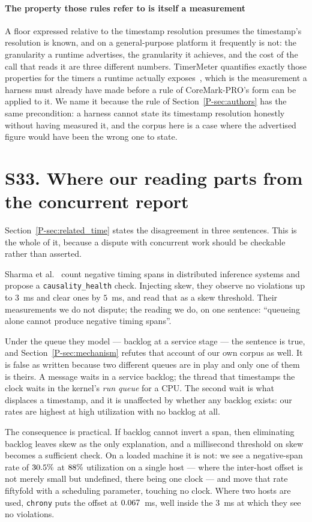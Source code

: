 \documentclass[10pt,journal,onecolumn]{IEEEtran}
\newcommand{\mainRelatedTime}{\ref{P-sec:related_time}}    %
\newcommand{\mainModeA}{\ref{P-sec:mechanism}}             %
\newcommand{\mainAuthors}{\ref{P-sec:authors}}        %
\begin{document}
\paragraph{The property those rules refer to is itself a measurement}
A floor expressed relative to the timestamp resolution presumes the timestamp's resolution is known,
and on a general-purpose platform it frequently is not: the granularity a runtime advertises,
the granularity it achieves, and the cost of the call that reads it are three different
numbers. TimerMeter quantifies exactly those properties for the timers a runtime actually
exposes~\cite{kuperberg2009timermeter}, which is the measurement a harness must already have
made before a rule of CoreMark-PRO's form can be applied to it. We name it because the rule of
Section~\mainAuthors{} has the same precondition: a harness cannot state its timestamp
resolution honestly without having measured it, and the corpus here is a case where the
advertised figure would have been the wrong one to state.

\section{S33. Where our reading parts from the concurrent report}
\label{sec:rival_reading}

Section~\mainRelatedTime{} states the disagreement in three sentences. This is the whole of
it, because a dispute with concurrent work should be checkable rather than asserted.

Sharma et al.~\cite{sharma2026causality} count negative timing spans in distributed inference
systems and propose a \texttt{causality\_health} check. Injecting skew, they observe no
violations up to $3$~ms and clear ones by $5$~ms, and read that as a skew threshold. Their
measurements we do not dispute; the reading we do, on one sentence: ``queueing alone cannot
produce negative timing spans''.

Under the queue they model --- backlog at a service stage --- the sentence is true, and
Section~\mainModeA{} refutes that account of our own corpus as well. It is false as written
because two different queues are in play and only one of them is theirs. A message waits in a
service backlog; the thread that timestamps the clock waits in the kernel's \emph{run queue} for
a CPU. The second wait is what displaces a timestamp, and it is unaffected by whether any backlog
exists: our rates are highest at high utilization with no backlog at all.

The consequence is practical. If backlog cannot invert a span, then eliminating backlog
leaves skew as the only explanation, and a millisecond threshold on skew becomes a
sufficient check. On a loaded machine it is not: we see a negative-span rate of
$30.5\%$ at $88\%$ utilization on a single host --- where the inter-host offset is not merely small but
undefined, there being one clock --- and move that rate fiftyfold with a scheduling
parameter, touching no clock. Where two hosts are used, \texttt{chrony} puts the offset at
$0.067$~ms, well inside the $3$~ms at which they see no violations.
\end{document}
